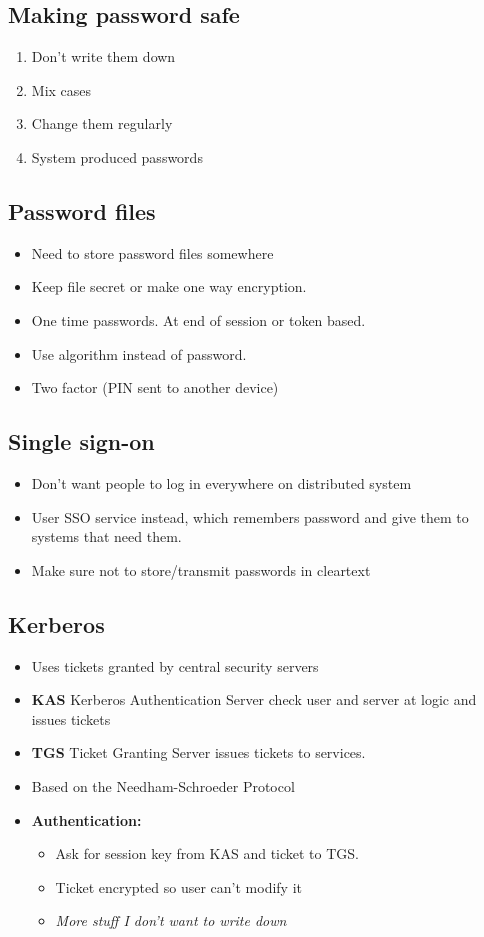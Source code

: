 \documentclass{article}
\begin{document}
	\subsection{Making password safe}
		\begin{enumerate}
			\item Don't write them down
			\item Mix cases
			\item Change them regularly
			\item System produced passwords			
		\end{enumerate}
		
	\subsection{Password files}
		\begin{itemize}
			\item Need to store password files somewhere
			\item Keep file secret or make one way encryption.
			\item One time passwords. At end of session or token based.
			\item Use algorithm instead of password.
			\item Two factor (PIN sent to another device)
		\end{itemize}
	
	\subsection{Single sign-on}
		\begin{itemize}
			\item Don't want people to log in everywhere on distributed system
			\item User SSO service instead, which remembers password and give them to systems that need them.
			\item Make sure not to store/transmit passwords in cleartext
		\end{itemize}
		
	\subsection{Kerberos}
		\begin{itemize}
			\item Uses tickets granted by central security servers
			\item \textbf{KAS} Kerberos Authentication Server check user and server at logic and issues tickets
			\item \textbf{TGS} Ticket Granting Server issues tickets to services.
			\item Based on the Needham-Schroeder Protocol
			\item \textbf{Authentication:}
			\begin{itemize}
				\item Ask for session key from KAS and ticket to TGS.
				\item Ticket encrypted so user can't modify it
				\item \textit{More stuff I don't want to write down}
			\end{itemize}
		\end{itemize}
		
\end{document}
